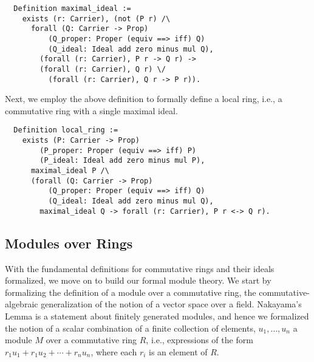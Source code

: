 \documentclass{article}
\begin{document}
\begin{verbatim}
  Definition maximal_ideal :=
    exists (r: Carrier), (not (P r) /\
      forall (Q: Carrier -> Prop)
          (Q_proper: Proper (equiv ==> iff) Q)
          (Q_ideal: Ideal add zero minus mul Q),
        (forall (r: Carrier), P r -> Q r) ->
        (forall (r: Carrier), Q r) \/
          (forall (r: Carrier), Q r -> P r)).
\end{verbatim}

 Next, we employ the above definition to formally define a local
ring, i.e., a commutative ring with a single maximal ideal.
 
\begin{verbatim}
  Definition local_ring :=
    exists (P: Carrier -> Prop)
        (P_proper: Proper (equiv ==> iff) P)
        (P_ideal: Ideal add zero minus mul P),
      maximal_ideal P /\
      (forall (Q: Carrier -> Prop)
          (Q_proper: Proper (equiv ==> iff) Q)
          (Q_ideal: Ideal add zero minus mul Q),
        maximal_ideal Q -> forall (r: Carrier), P r <-> Q r).
\end{verbatim}



\subsection{Modules over Rings}
With the fundamental definitions for commutative rings and their ideals formalized, we move on 
to build our formal module theory.  
We start by formalizing the definition of a module over a commutative ring,
the commutative-algebraic generalization of the notion of a vector space over a
field. Nakayama's Lemma is a statement about finitely generated modules, and
hence we formalized the notion of a scalar combination of a finite
collection of elements, $u_1, \ldots, u_n$ a module $M$ over a commutative ring $R$, i.e.,
expressions of the form $r_1 u_1 + r_1 u_2 + \cdots + r_n u_n$, where each
$r_i$ is an element of $R$.
\end{document}
